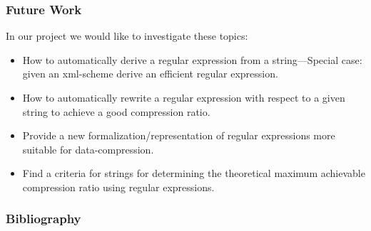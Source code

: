\documentclass[slidestop,compress,mathserif, xcolor=table]{beamer}
\begin{document}
\begin{frame}[fragile]
  \frametitle{Future Work}

  In our project we would like to investigate these topics:

  \begin{itemize}
  \item How to automatically derive a regular expression from a string---Special
    case: given an xml-scheme derive an efficient regular expression.
  \item How to automatically rewrite a regular expression with respect to a
    given string to achieve a good compression ratio.
  \item Provide a new formalization/representation of regular expressions more
    suitable for data-compression.
  \item Find a criteria for strings for determining the theoretical maximum
    achievable compression ratio using regular expressions.
  \end{itemize}

\end{frame}


     



\begin{frame}
  \frametitle{Bibliography}
  
  
  
  
\end{frame}
\end{document}
